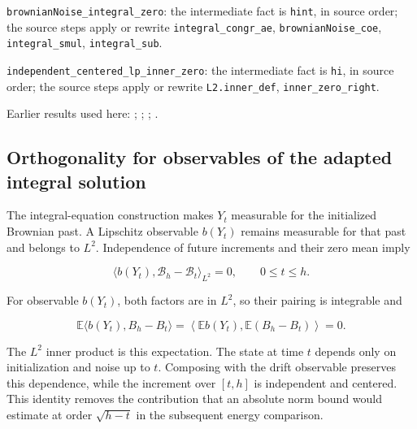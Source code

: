 \documentclass[11pt,a4paper]{report}
\begin{document}
\begin{leanbox}
\texttt{brownian\allowbreak{}Noise\_\allowbreak{}integral\_\allowbreak{}zero}: the intermediate fact is \texttt{hint}, in source order; the source steps apply or rewrite \texttt{integral\_\allowbreak{}congr\_\allowbreak{}ae}, \texttt{brownian\allowbreak{}Noise\_\allowbreak{}coe}, \texttt{integral\_\allowbreak{}smul}, \texttt{integral\_\allowbreak{}sub}.



\texttt{independent\_\allowbreak{}centered\_\allowbreak{}lp\_\allowbreak{}inner\_\allowbreak{}zero}: the intermediate fact is \texttt{hi}, in source order; the source steps apply or rewrite \texttt{L2.\allowbreak{}inner\_\allowbreak{}def}, \texttt{inner\_\allowbreak{}zero\_\allowbreak{}right}.
\end{leanbox}


Earlier results used here: \cite[Section~3.24.1]{LangevinLean2026ULASC}; \cite[Section~3.24.8]{LangevinLean2026ULASC}; \cite[Section~3.24.9]{LangevinLean2026ULASC}; \cite[Section~3.25.1]{LangevinLean2026ULASC}.
\subsection{\texorpdfstring{Orthogonality for observables of the adapted integral solution}{Orthogonality for observables of the adapted integral solution}}
\label{report-step-ProximalLangevin-SplittingOrthogonality-lean-5}


The integral-equation construction makes \(Y_t\) measurable for the initialized Brownian past. A Lipschitz observable \(b(Y_t)\) remains measurable for that past and belongs to \(L^2\). Independence of future increments and their zero mean imply

\[\langle b(Y_t),\mathcal B_h-\mathcal B_t\rangle_{L^2}=0,\qquad0\le t\le h.\]

For observable \(b(Y_t)\), both factors are in \(L^2\), so their pairing is integrable and

\[\mathbb E\langle b(Y_t),B_h-B_t\rangle=\left\langle\mathbb E b(Y_t),\mathbb E(B_h-B_t)\right\rangle=0.\]

The \(L^2\) inner product is this expectation. The state at time \(t\) depends only on initialization and noise up to \(t\). Composing with the drift observable preserves this dependence, while the increment over \([t,h]\) is independent and centered. This identity removes the contribution that an absolute norm bound would estimate at order \(\sqrt{h-t}\) in the subsequent energy comparison.
\end{document}
